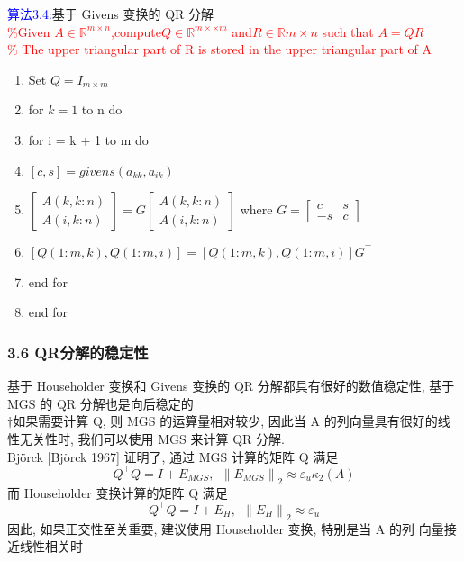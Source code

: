 \documentclass[notheorems,serif]{beamer}
\begin{document}
\begin{frame}
\textcolor{blue}{算法3.4:}基于 Givens 变换的 QR 分解\\
\textcolor{red}{\%Given $A \in \mathbb{R}^{m\times n}$,compute$Q \in \mathbb{R}^{m×\times m}$ and$R\in \mathbb{R}{m\times n}$ such that $A = QR$\\
	\% The upper triangular part of R is stored in the upper triangular part of A}
\begin{enumerate}[1:]
	\item Set $Q=I_{m\times m}$
	\item for $k=1$ to n do
	\item \qquad for i = k + 1 to m do
	\item \qquad \qquad $[c, s]=givens(a_{kk}, a_{ik})$
	\item \qquad \qquad $\left[\begin{array}{c}{A(k, k : n)} \\ {A(i, k : n)}\end{array}\right]=G\left[\begin{array}{c}{A(k, k : n)} \\ {A(i, k : n)}\end{array}\right]$ where $G=\left[\begin{array}{cc}{c} & {s} \\ {-s} & {c}\end{array}\right]$
	\item \qquad \qquad $[Q(1 : m, k), Q(1 : m, i)]=[Q(1 : m, k), Q(1 : m, i)] G^{\top}$
	\item \qquad end for
	\item end for
\end{enumerate}
\end{frame}

\begin{frame}
\frametitle{3.6 QR分解的稳定性}
\noindent 基于 Householder 变换和 Givens 变换的 QR 分解都具有很好的数值稳定性, 基于 MGS 的 QR 分解也是向后稳定的\\
$\dagger$如果需要计算 Q, 则 MGS 的运算量相对较少, 因此当 A 的列向量具有很好的线性无关性时, 我们可以使用 MGS 来计算 QR 分解.\\
Björck [Björck 1967] 证明了, 通过 MGS 计算的矩阵 Q 满足
$$
Q^{\top} Q=I+E_{M G S},~~\left\|E_{M G S}\right\|_{2} \approx \varepsilon_{u} \kappa_{2}(A)
$$
而 Householder 变换计算的矩阵 Q 满足
$$
Q^{\top} Q=I+E_{H},~~\left\|E_{H}\right\|_{2} \approx \varepsilon_{u}
$$
因此, 如果正交性至关重要, 建议使用 Householder 变换, 特别是当 A 的列 向量接近线性相关时
\end{frame}
\end{document}
